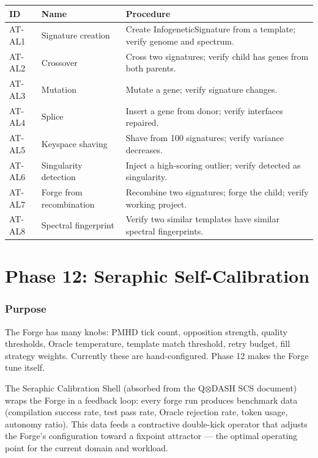 \documentclass[11pt,a4paper,twoside]{article}
\theoremstyle{definition}
\theoremstyle{plain}
\theoremstyle{remark}
\begin{document}
\begin{longtable}{l l p{5.5cm}}
\toprule
\textbf{ID} & \textbf{Name} & \textbf{Procedure} \\
\midrule
AT-AL1 & Signature creation & Create InfogeneticSignature from a
  template; verify genome and spectrum. \\
AT-AL2 & Crossover & Cross two signatures; verify child has genes
  from both parents. \\
AT-AL3 & Mutation & Mutate a gene; verify signature changes. \\
AT-AL4 & Splice & Insert a gene from donor; verify interfaces
  repaired. \\
AT-AL5 & Keyspace shaving & Shave from 100 signatures; verify
  variance decreases. \\
AT-AL6 & Singularity detection & Inject a high-scoring outlier;
  verify detected as singularity. \\
AT-AL7 & Forge from recombination & Recombine two signatures; forge
  the child; verify working project. \\
AT-AL8 & Spectral fingerprint & Verify two similar templates have
  similar spectral fingerprints. \\
\end{longtable}


\part{Phase 12: Seraphic Self-Calibration}\label{part:seraphic}

\section{Purpose}\label{sec:se:purpose}

The Forge has many knobs: PMHD tick count, opposition strength,
quality thresholds, Oracle temperature, template match threshold,
retry budget, fill strategy weights. Currently these are
hand-configured. Phase 12 makes the Forge tune itself.

The Seraphic Calibration Shell (absorbed from the Q$\otimes$DASH SCS
document) wraps the Forge in a feedback loop: every forge run
produces benchmark data (compilation success rate, test pass rate,
Oracle rejection rate, token usage, autonomy ratio). This data feeds
a contractive double-kick operator that adjusts the Forge's
configuration toward a fixpoint attractor --- the optimal operating
point for the current domain and workload.
\end{document}
